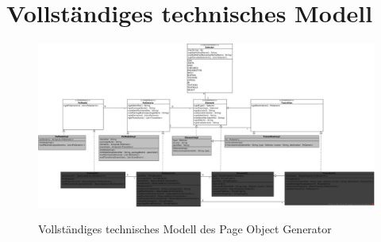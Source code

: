 \newpage
\section{Vollständiges technisches Modell}
\label{anhang:vollständiges_technisches_modell}


\begin{figure}[h]
  \centering  
  \includegraphics[scale=0.235, angle=90]{img/ComplexModel.jpg}\\
  \caption{Vollständiges technisches Modell des Page Object Generator }
  \label{fig:state_mashine_zuordnung}
\end{figure}

\newpage

